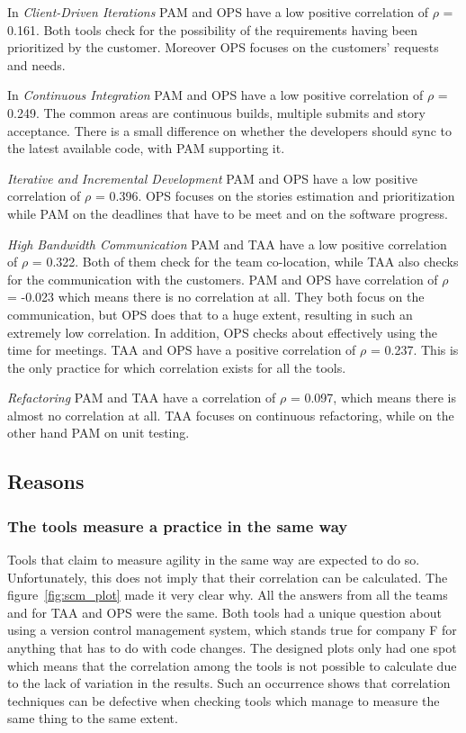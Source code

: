 In \textit{Client-Driven Iterations} PAM and OPS have a low positive correlation of $\rho$ = 0.161. Both tools check for the possibility of the requirements having been prioritized by the customer. Moreover OPS focuses on the customers' requests and needs.

In \textit{Continuous Integration} PAM and OPS have a low positive correlation of $\rho$ = 0.249. The common areas are continuous builds, multiple submits and story acceptance. There is a small difference on whether the developers should sync to the latest available code, with PAM supporting it. 

\textit{Iterative and Incremental Development} PAM and OPS have a low positive correlation of $\rho$ = 0.396. OPS focuses on the stories estimation and prioritization while PAM on the deadlines that have to be meet and on the software progress. 

\textit{High Bandwidth Communication} PAM and TAA have a low positive correlation of $\rho$ = 0.322. Both of them check for the team co-location, while TAA also checks for the communication with the customers. PAM and OPS have correlation of $\rho$ = -0.023 which means there is no correlation at all. They both focus on the communication, but OPS does that to a huge extent, resulting in such an extremely low correlation. In addition, OPS checks about effectively using the time for meetings. TAA and OPS have a positive correlation of $\rho$ = 0.237. This is the only practice for which correlation exists for all the tools.

\textit{Refactoring} PAM and TAA have a correlation of $\rho$ = 0.097, which means there is almost no correlation at all. TAA focuses on continuous refactoring, while on the other hand PAM on unit testing.


\subsection{Reasons}

\subsubsection{The tools measure a practice in the same way}
Tools that claim to measure agility in the same way are expected to do so. Unfortunately, this does not imply that their correlation can be calculated. The figure~\ref{fig:scm_plot} made it very clear why. All the answers from all the teams and for TAA and OPS were the same. Both tools had a unique question about using a version control management system, which stands true for company F for anything that has to do with code changes. The designed plots only had one spot which means that the correlation among the tools is not possible to calculate due to the lack of variation in the results. Such an occurrence shows that correlation techniques can be defective when checking tools which manage to measure the same thing to the same extent.

